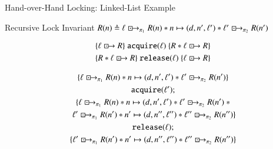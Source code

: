 \documentclass[professionalfonts, xcolor=table]{beamer}
\newcommand{\islock}{\boxdotright}
\begin{document}
{\begin{frame}{Hand-over-Hand Locking: Linked-List Example}
  \begin{block}{Recursive Lock Invariant}
    \centering
    $R(n) \triangleq \ell \islock_{\pi_1} R(n) * n \mapsto (d, n', \ell') * \ell' \islock_{\pi_2} R(n')$
  \end{block}
  \pause
  \begin{block}{}
    \vspace*{-\baselineskip}\setlength\belowdisplayshortskip{0pt}
    \begin{gather*}
      \{ \ell \islock R \}\ \texttt{acquire}(\ell)\ \{ R * \ell \islock R \} \\
      \{ R * \ell \islock R \}\ \texttt{release}(\ell)\ \{ \ell \islock R \}
    \end{gather*}
  \end{block}
  \begin{block}{}
    \vspace*{-\baselineskip}\setlength\belowdisplayshortskip{0pt}
    \begin{gather*}
      \{ \ell \islock_{\pi_1} R(n) * n \mapsto (d, n', \ell') * \ell' \islock_{\pi_2} R(n') \}\\
      \texttt{acquire}(\ell');\\
      \{ \ell \islock_{\pi_1} R(n) * n \mapsto (d, n', \ell') * \ell' \islock_{\pi_2} R(n')\ * \\
      \ \ell' \islock_{\pi_1} R(n') * n' \mapsto (d, n'', \ell'') * \ell'' \islock_{\pi_2} R(n'') \}\\
      \texttt{release}(\ell);\\
      \{ \ell' \islock_{\pi_1} R(n') * n' \mapsto (d, n'', \ell'') * \ell'' \islock_{\pi_2} R(n'') \}
    \end{gather*}
  \end{block}
\end{frame}

}

\end{document}
